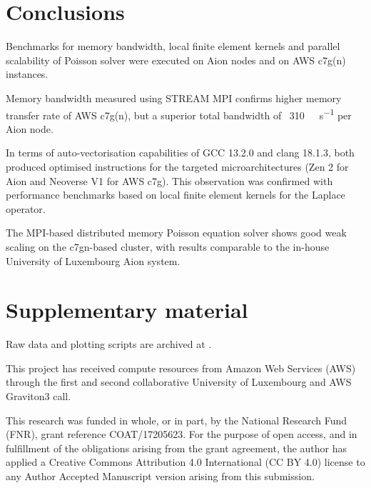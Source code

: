 \section*{Conclusions}

Benchmarks for memory bandwidth, local finite element kernels and parallel
scalability of Poisson solver were executed on Aion nodes and on AWS c7g(n)
instances.

Memory bandwidth measured using STREAM MPI confirms higher memory transfer rate
of AWS c7g(n), but a superior total bandwidth of ~\SI{310}{\giga\byte\per\second}
per Aion node.

In terms of auto-vectorisation capabilities of GCC 13.2.0 and clang 18.1.3,
both produced optimised instructions for the targeted microarchitectures (Zen 2
for Aion and Neoverse V1 for AWS c7g). This observation was confirmed with
performance benchmarks based on local finite element kernels for the Laplace operator.

The MPI-based distributed memory Poisson equation solver shows good weak
scaling on the c7gn-based cluster, with results comparable to the in-house
University of Luxembourg Aion system.


\section*{Supplementary material}
Raw data and plotting scripts are archived at \citep{habera_2024_13748405}.

\begin{acknowledgement}
This project has received compute resources from Amazon Web Services (AWS)
through the first and second collaborative University of Luxembourg and
AWS Graviton3 call.

This research was funded in whole, or in part, by the National Research Fund
(FNR), grant reference COAT/17205623. For the purpose of open access, and in
fulfillment of the obligations arising from the grant agreement, the author has
applied a Creative Commons Attribution 4.0 International (CC BY 4.0) license to
any Author Accepted Manuscript version arising from this submission.
\end{acknowledgement}



